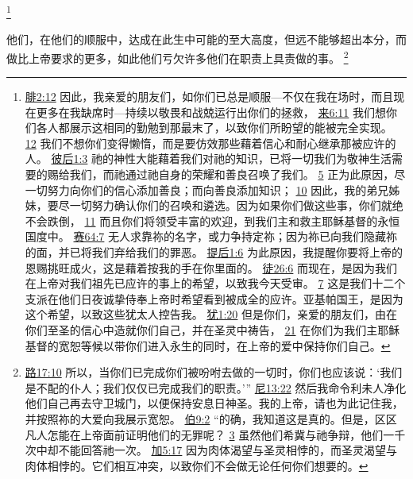 \documentclass[12pt, a4paper, oneside]{ctexart}
\newcounter{parnum}[section]
\newcommand{\N}{%
   \noindent\refstepcounter{parnum}%
    \makebox[\parindent][l]{\textbf{\arabic{parnum}.}}}
\begin{document}
	\footnote {
		\href{https://biblehub.com/philippians/2-12.htm}{腓2:12} 因此，我亲爱的朋友们，如你们已总是顺服---不仅在我在场时，而且现在更多在我缺席时---持续以敬畏和战兢运行出你们的拯救，
		\href{https://biblehub.com/hebrews/6-11.htm}{来6:11} 我们想你们各人都展示这相同的勤勉到那最末了，以致你们所盼望的能被完全实现。
		\href{https://biblehub.com/hebrews/6-12.htm}{12} 我们不想你们变得懒惰，而是要仿效那些藉着信心和耐心继承那被应许的人。
		\href{https://biblehub.com/2_peter/1-3.htm}{彼后1:3} 祂的神性大能藉着我们对祂的知识，已将一切我们为敬神生活需要的赐给我们，而祂通过祂自身的荣耀和善良召唤了我们。
		\href{https://biblehub.com/2_peter/1-5.htm}{5} 正为此原因，尽一切努力向你们的信心添加善良；而向善良添加知识；
		\href{https://biblehub.com/2_peter/1-10.htm}{10} 因此，我的弟兄姊妹，要尽一切努力确认你们的召唤和遴选。因为如果你们做这些事，你们就绝不会跌倒，
		\href{https://biblehub.com/2_peter/1-11.htm}{11} 而且你们将领受丰富的欢迎，到我们主和救主耶稣基督的永恒国度中。
		\href{https://biblehub.com/isaiah/64-7.htm}{赛64:7} 无人求靠祢的名字，或力争持定祢；因为祢已向我们隐藏祢的面，并已将我们弃给我们的罪恶。
		\href{https://biblehub.com/2_timothy/1-6.htm}{提后1:6} 为此原因，我提醒你要将上帝的恩赐挑旺成火，这是藉着按我的手在你里面的。
		\href{https://biblehub.com/acts/26-6.htm}{徒26:6} 而现在，是因为我们在上帝对我们祖先已应许的事上的希望，以致我今天受审。
		\href{https://biblehub.com/acts/26-7.htm}{7} 这是我们十二个支派在他们日夜诚挚侍奉上帝时希望看到被成全的应许。亚基帕国王，是因为这个希望，以致这些犹太人控告我。
		\href{https://biblehub.com/jude/1-20.htm}{犹1:20} 但是你们，亲爱的朋友们，由在你们至圣的信心中造就你们自己，并在圣灵中祷告，
		\href{https://biblehub.com/jude/1-21.htm}{21} 在你们为我们主耶稣基督的宽恕等候以带你们进入永生的同时，在上帝的爱中保持你们自己。
	}

\N 他们，在他们的顺服中，达成在此生中可能的至大高度，但远不能够超出本分，而做比上帝要求的更多，如此他们亏欠许多他们在职责上具责做的事。
	\footnote {
		\href{https://biblehub.com/luke/17-10.htm}{路17:10} 所以，当你们已完成你们被吩咐去做的一切时，你们也应该说：‘我们是不配的仆人；我们仅仅已完成我们的职责。’”
		\href{https://biblehub.com/nehemiah/13-22.htm}{尼13:22} 然后我命令利未人净化他们自己再去守卫城门，以便保持安息日神圣。我的上帝，请也为此记住我，并按照祢的大爱向我展示宽恕。
		\href{https://biblehub.com/job/9-2.htm}{伯9:2} “的确，我知道这是真的。但是，区区凡人怎能在上帝面前证明他们的无罪呢？
		\href{https://biblehub.com/job/9-3.htm}{3} 虽然他们希冀与祂争辩，他们一千次中却不能回答祂一次。
		\href{https://biblehub.com/galatians/5-17.htm}{加5:17} 因为肉体渴望与圣灵相悖的，而圣灵渴望与肉体相悖的。它们相互冲突，以致你们不会做无论任何你们想要的。
	}
\end{document}
